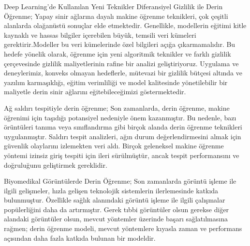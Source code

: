 \documentclass{beamer}                                                                                          %
\begin{document}
    
    \begin{frame}{Deep Learning'de Kullanılan Yeni Teknikler}
	    \justifying
    		\color{myred1}
    		Diferansiyel Gizlilik ile Derin Öğrenme; \color{black} \newline
                Yapay sinir ağlarına dayalı makine öğrenme teknikleri, çok çeşitli alanlarda olağanüstü sonuçlar elde etmektedir. Genellikle, modellerin eğitimi kitle kaynaklı ve hassas bilgiler içerebilen büyük, temsili veri kümeleri gerektirir.Modeller bu veri kümelerinde özel bilgileri açığa çıkarmamalıdır. Bu hedefe yönelik olarak, öğrenme için yeni algoritmik teknikler ve farklı gizlilik çerçevesinde gizlilik maliyetlerinin rafine bir analizi geliştiriyoruz. Uygulama ve deneylerimiz, konveks olmayan hedeflerle, mütevazi bir gizlilik bütçesi altında ve yazılım karmaşıklığı, eğitim verimliliği ve model kalitesinde yönetilebilir bir maliyetle derin sinir ağlarını eğitebileceğimizi göstermektedir.\par \vspace{50} 
    \end{frame}
    
    
    \begin{frame}{}
	    \justifying
            \color{myred1} Ağ saldırı tespitiyle derin öğrenme; \color{black} \newline
            Son zamanlarda, derin öğrenme, makine öğrenimi için taşıdığı potansiyel nedeniyle önem kazanmıştır. Bu nedenle, bazı örüntüleri tanıma veya sınıflandırma gibi birçok alanda derin öğrenme teknikleri uygulanmıştır. Saldırı tespit analizleri, ağın durum değerlendirmesini almak için güvenlik olaylarını izlemekten veri aldı. Birçok geleneksel makine öğrenme yöntemi izinsiz giriş tespiti için ileri sürülmüştür, ancak tespit performansını ve doğruluğunu geliştirmek gereklidir.
    \end{frame}
    
    
    \begin{frame}{}
	    \justifying
    	    \color{myred1}Biyomedikal Görüntülerde Derin Öğrenme;\color{black} \newline Son zamanlarda görüntü işleme ile ilgili gelişmeler, hızla gelişen teknolojik sistemlerin ilerlemesinde katkıda bulunmuştur. Özellikle sağlık alanındaki görüntü işleme ile ilgili çalışmalar popülerliğini daha da artırmıştır. Gerek tıbbi görüntüler olsun gerekse diğer alandaki görüntüler olsun, mevcut yöntemler üzerinde başarı sağlatılmasına rağmen; derin öğrenme modeli, mevcut yöntemlere kıyasla zaman ve performans açısından daha fazla katkıda bulunan bir modeldir. 
    \end{frame}
    
\end{document}
